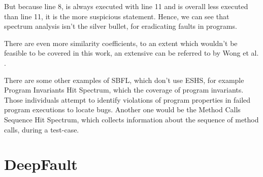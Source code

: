 But because line 8, is always executed with line 11 and is overall less executed than line 11, it is the more suspicious statement.
Hence, we can see that spectrum analysis isn't the silver bullet, for eradicating faults in programs.


There are even more similarity coefficients, to an extent which wouldn't be feasible to be covered in this work, an extensive can be referred to by Wong et al. \cite{wong_survey_2016}.

There are some other examples of SBFL, which don't use ESHS, for example Program Invariants Hit Spectrum, which the coverage of program invariants.
Those individuals attempt to identify violations of program properties in failed program executions to locate bugs.
Another one would be the Method Calls Sequence Hit Spectrum, which collects information about the sequence of method calls, during a test-case.


\section{DeepFault}\label{sec:deepfault}\cite{wong_dstar_2014}
